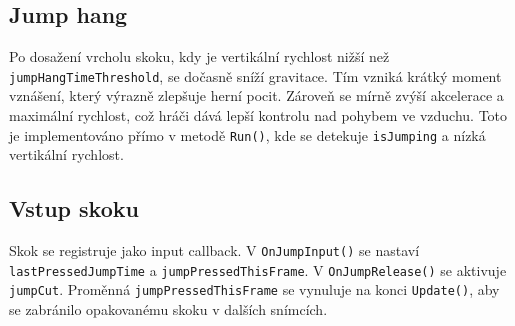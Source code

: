\subsection{Jump hang}
Po dosažení vrcholu skoku, kdy je vertikální rychlost nižší než \texttt{jumpHangTimeThreshold}, se dočasně sníží gravitace. Tím vzniká krátký moment vznášení, který výrazně zlepšuje herní pocit. Zároveň se mírně zvýší akcelerace a maximální rychlost, což hráči dává lepší kontrolu nad pohybem ve vzduchu. Toto je implementováno přímo v metodě \texttt{Run()}, kde se detekuje \texttt{isJumping} a nízká vertikální rychlost.

\subsection{Vstup skoku}
Skok se registruje jako input callback. V \texttt{OnJumpInput()} se nastaví \texttt{lastPressedJumpTime} a \texttt{jumpPressedThisFrame}. V \texttt{OnJumpRelease()} se aktivuje \texttt{jumpCut}. Proměnná \texttt{jumpPressedThisFrame} se vynuluje na konci \texttt{Update()}, aby se zabránilo opakovanému skoku v dalších snímcích.
